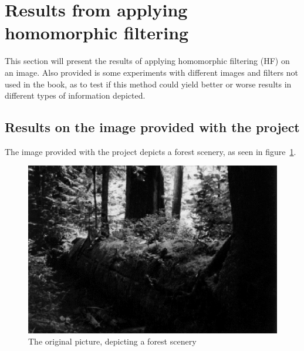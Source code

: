 \section{Results from applying homomorphic filtering}
	This section will present the results of applying homomorphic filtering (HF)
	on an image. Also provided is some experiments with different images
	and filters not used in the book, as to test if this method could yield
	better or worse results in different types of information depicted.
	\subsection{Results on the image provided with the project}
		The image provided with the project depicts a forest scenery, %
		as seen in figure~\ref{fig:original}.
		\begin{figure}[h!]
			\centering
			\includegraphics[width=0.6\linewidth]{pics/orig_pic.png}
			\caption{The original picture, depicting a forest scenery}
			\label{fig:original}		
		\end{figure}		
		
